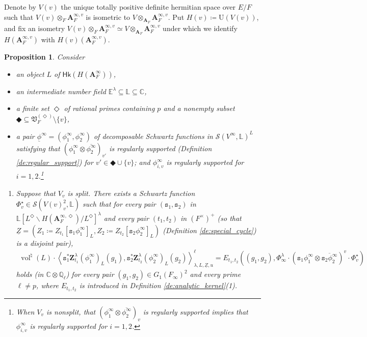 \documentclass[12pt]{amsart}
\numberwithin{equation}{section}
\theoremstyle{plain}
\newtheorem{proposition}{Proposition}[section]
\theoremstyle{definition}
\theoremstyle{remark}
\renewcommand{\b}[1]{\mathbf{#1}}
\renewcommand{\d}[1]{\mathbb{#1}}
\newcommand{\f}[1]{\mathfrak{#1}}
\renewcommand{\r}[1]{\mathrm{#1}}
\newcommand{\s}[1]{\mathscr{#1}}
\renewcommand{\sf}[1]{\mathsf{#1}}
\renewcommand{\(}{\left(}
\renewcommand{\)}{\right)}
\newcommand{\ol}[1]{\overline{#1}{}}
\newcommand{\ul}{\underline}
\newcommand{\bA}{\b A}
\newcommand{\dC}{\d C}
\newcommand{\dE}{\d E}
\newcommand{\dL}{\d L}
\newcommand{\dQ}{\d Q}
\newcommand{\fV}{\f V}
\newcommand{\rU}{\r U}
\newcommand{\sS}{\s S}
\newcommand{\ts}{\mathtt{s}}
\newcommand{\bbZ}{\boldsymbol{Z}}
\newcommand{\llangle}{\left\langle}
\newcommand{\rrangle}{\right\rangle}
\newcommand{\Hk}{\sf{Hk}}
\DeclareMathOperator{\vol}{vol}
\begin{document}
Denote by $V(v)$ the unique totally positive definite hermitian space over $E/F$ such that $V(v)\otimes_F\bA_F^{\infty,v}$ is isometric to $V\otimes_{\bA_F}\bA_F^{\infty,v}$. Put $H(v)\coloneqq\rU(V(v))$, and fix an isometry $V(v)\otimes_F\bA_F^{\infty,v}\simeq V\otimes_{\bA_F}\bA_F^{\infty,v}$ under which we identify $H(\bA_F^{\infty,v})$ with $H(v)(\bA_F^{\infty,v})$.



\begin{proposition}\label{pr:height_curve}
Consider
\begin{itemize}
  \item an object $L$ of $\Hk(H(\bA_F^\infty))$,

  \item an intermediate number field $\dE^\lambda\subseteq\dL\subseteq\dC$,

  \item a finite set $\Diamond$ of rational primes containing $p$ and a nonempty subset $\Diamondblack\subseteq\fV_F^{(\Diamond)}\setminus\{v\}$,

  \item a pair $\ul\phi^\infty=(\phi^\infty_1,\phi^\infty_2)$ of decomposable Schwartz functions in $\sS(V^\infty,\dL)^L$ satisfying that $(\phi^\infty_1\otimes\ol{\phi^\infty_2})_{v'}$ is regularly supported (Definition \ref{de:regular_support}) for $v'\in\Diamondblack\cup\{v\}$; and $\phi^\infty_{i,v}$ is regularly supported for $i=1,2$.\footnote{When $V_v$ is nonsplit, that $(\phi^\infty_1\otimes\ol{\phi^\infty_2})_v$ is regularly supported implies that $\phi^\infty_{i,v}$ is regularly supported for $i=1,2$.}
\end{itemize}
\begin{enumerate}
  \item Suppose that $V_v$ is split. There exists a Schwartz function $\Phi^\star_v\in\sS(V(v)_v^2,\dL)$ such that for every pair $(\ts_1,\ts_2)$ in $\dL[L^\Diamond\backslash H(\bA_F^{\infty,\Diamond})/L^\Diamond]^\lambda$ and every pair $(t_1,t_2)$ in $(F^\times)^+$ (so that $\ul{Z}=(Z_1\coloneqq Z_{t_1}[\ts_1\phi^\infty_1]_L,Z_2\coloneqq Z_{t_2}[\ts_2\phi^\infty_2]_L)$ (Definition \ref{de:special_cycle}) is a disjoint pair),
      \begin{align*}
      \vol^\natural(L)\cdot
      \llangle\ts_1^*\bbZ^\lambda_{t_1}(\phi^\infty_1)_L(g_1),
      \ts_2^*\bbZ^\lambda_{t_2}(\phi^\infty_2)_L(g_2)\rrangle_{\lambda,L,\ul{Z},u}^\ell
      =E_{t_1,t_2}((g_1,g_2),\Phi^\lambda_\infty\cdot(\ts_1\phi^\infty_1\otimes\ol{\ts_2\phi^\infty_2})^v\cdot\Phi^\star_v)
      \end{align*}
      holds (in $\dC\otimes\dQ_\ell$) for every pair $(g_1,g_2)\in G_1(F_\infty)^2$ and every prime $\ell\neq p$, where $E_{t_1,t_2}$ is introduced in Definition \ref{de:analytic_kernel}(1).


\end{enumerate}
\end{proposition}
\end{document}
